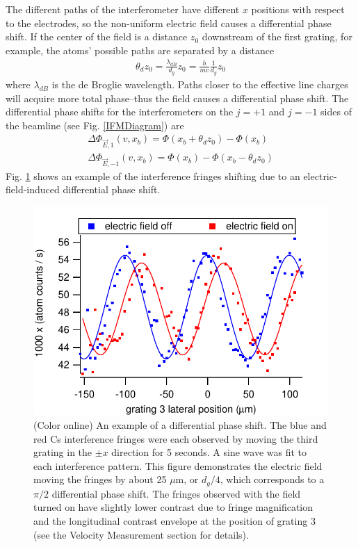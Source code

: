 \documentclass[twocolumn,prl,showpacs,superscriptaddress]{revtex4-1}   %
\newcommand{\figref}[1]{Fig. \ref{#1}}
\begin{document}
The different paths of the interferometer have different $x$ positions with respect to the electrodes, so the non-uniform electric field causes a differential phase shift. If the center of the field is a distance $z_0$ downstream of the first grating, for example, the atoms' possible paths are separated by a distance 
\begin{align}
	\theta_d z_0 = \frac{\lambda_{dB}}{d_g} z_0 = \frac{h}{mv}\frac{1}{d_g} z_0
	\label{pathSeparation}
\end{align}
where $\lambda_{dB}$ is the de Broglie wavelength. Paths closer to the effective line charges will acquire more total phase--thus the field causes a differential phase shift. The differential phase shifts for the interferometers on the $j=+1$ and $j=-1$ sides of the beamline (see \figref{IFMDiagram}) are
\begin{align}
	\Delta\Phi_{\vec{E},1}(v,x_b) = \Phi(x_b+\theta_d z_0) - \Phi(x_b) \nonumber \\
	\Delta\Phi_{\vec{E},-1}(v,x_b) = \Phi(x_b) - \Phi(x_b-\theta_d z_0)
	\label{deltaPhasePillars}
\end{align}
\figref{phaseShiftExample} shows an example of the interference fringes shifting due to an electric-field-induced differential phase shift.

\begin{figure}
\includegraphics[width=\linewidth,keepaspectratio]{countsVsGratingPos_150420.pdf}
\caption{\label{phaseShiftExample}(Color online) An example of a differential phase shift. The blue and red Cs interference fringes were each observed by moving the third grating in the $\pm x$ direction for 5 seconds. A sine wave was fit to each interference pattern. This figure demonstrates the electric field moving the fringes by about 25 $\mu$m, or $d_g/4$, which corresponds to a $\pi/2$ differential phase shift. The fringes observed with the field turned on have slightly lower contrast due to fringe magnification and the longitudinal contrast envelope at the position of grating 3 (see the Velocity Measurement section for details).}
\end{figure}
\end{document}
